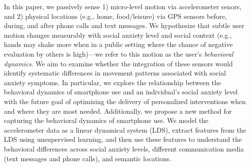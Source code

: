 In this paper, we passively sense 1) micro-level motion via accelerometer senors, and 2) physical locations (e.g., home, food/leisure) via GPS sensors before, during, and after phone calls and text messages.   We hypothesize that subtle user motion changes measurably with social anxiety level and social context (e.g., hands may shake more when in a public setting where the chance of negative evaluation by others is high)---we refer to this motion as the user's \emph{behavioral dynamics}.  We aim to examine whether the integration of these sensors would identify systematic differences in movement patterns associated with social anxiety symptoms.  In particular, we explore the relationship between the behavioral dynamics of smartphone use and an individual's social anxiety level with the future goal of optimizing the delivery of personalized interventions when and where they are most needed. Additionally,  we propose a new method for capturing the behavioral dynamics of smartphone use. We model the accelerometer data as a linear dynamical system (LDS), extract features from the LDS using unsupervised learning, and then use these features to understand the behavioral differences across social anxiety levels, different communication media (text messages and phone calls), and semantic locations.







